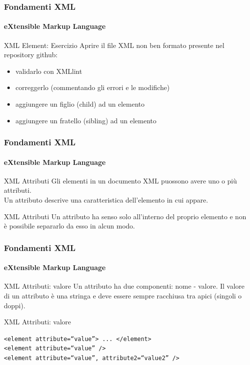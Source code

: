 \begin{frame}
    \frametitle{Fondamenti XML}
    \framesubtitle{eXtensible Markup Language}
    \addtocounter{nframe}{1}

	\begin{block}{XML Element: Esercizio}
		Aprire il file XML non ben formato presente nel repository github:
		\begin{itemize}
			\item validarlo con XMLlint
			\item correggerlo (commentando gli errori e le modifiche)
			\item aggiungere un figlio (child) ad un elemento
			\item aggiungere un fratello (sibling) ad un elemento
		\end{itemize}
	\end{block}

\end{frame}


\begin{frame}
    \frametitle{Fondamenti XML}
    \framesubtitle{eXtensible Markup Language}
    \addtocounter{nframe}{1}

	\begin{block}{XML Attributi}
		Gli elementi in un documento XML puossono avere uno o più attributi.
		\\ Un attributo descrive una caratteristica dell'elemento in cui appare.
	\end{block}

	\begin{block}{XML Attributi}
		Un attributo ha senso solo all'interno del proprio elemento e non è possibile separarlo da esso in alcun modo.
	\end{block}

\end{frame}


\begin{frame}
    \frametitle{Fondamenti XML}
    \framesubtitle{eXtensible Markup Language}
    \addtocounter{nframe}{1}

	\begin{block}{XML Attributi: valore}
		Un attributo ha due componenti: nome - valore.
		Il valore di un attributo è una stringa e deve essere sempre racchiusa tra apici (singoli o doppi).
	\end{block}

	\begin{block}{XML Attributi: valore}
		\begin{center}
			\texttt{<element attribute=``value''> ... </element>}
			\\\texttt{<element attribute=``value'' />}
			\\\texttt{<element attribute=``value'', attribute2=``value2'' />}
		\end{center}
	\end{block}

\end{frame}

